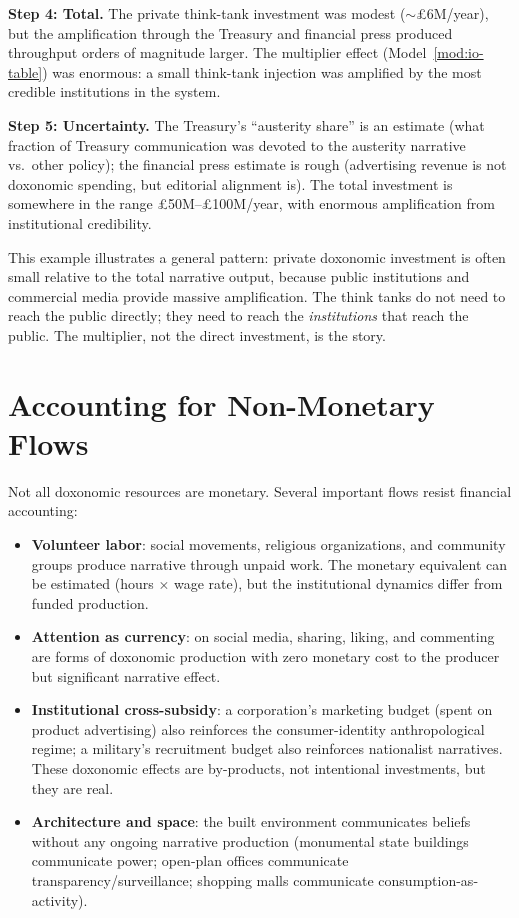 \textbf{Step 4: Total.}
The private think-tank investment was modest ($\sim$\pounds6M/year), but the amplification through the Treasury and financial press produced throughput orders of magnitude larger.
The multiplier effect (Model~\ref{mod:io-table}) was enormous: a small think-tank injection was amplified by the most credible institutions in the system.

\textbf{Step 5: Uncertainty.}
The Treasury's ``austerity share'' is an estimate (what fraction of Treasury communication was devoted to the austerity narrative vs.\ other policy); the financial press estimate is rough (advertising revenue is not doxonomic spending, but editorial alignment is).
The total investment is somewhere in the range \pounds50M--\pounds100M/year, with enormous amplification from institutional credibility.

\begin{remark}
This example illustrates a general pattern: private doxonomic investment is often small relative to the total narrative output, because public institutions and commercial media provide massive amplification.
The think tanks do not need to reach the public directly; they need to reach the \emph{institutions} that reach the public.
The multiplier, not the direct investment, is the story.
\end{remark}


\section{Accounting for Non-Monetary Flows}
\label{sec:ch14-nonmonetary}

Not all doxonomic resources are monetary.
Several important flows resist financial accounting:

\begin{itemize}[nosep]
  \item \textbf{Volunteer labor}: social movements, religious organizations, and community groups produce narrative through unpaid work.
  The monetary equivalent can be estimated (hours $\times$ wage rate), but the institutional dynamics differ from funded production.
  \item \textbf{Attention as currency}: on social media, sharing, liking, and commenting are forms of doxonomic production with zero monetary cost to the producer but significant narrative effect.
  \item \textbf{Institutional cross-subsidy}: a corporation's marketing budget (spent on product advertising) also reinforces the consumer-identity anthropological regime; a military's recruitment budget also reinforces nationalist narratives.
  These doxonomic effects are by-products, not intentional investments, but they are real.
  \item \textbf{Architecture and space}: the built environment communicates beliefs without any ongoing narrative production (monumental state buildings communicate power; open-plan offices communicate transparency/surveillance; shopping malls communicate consumption-as-activity).
\end{itemize}

